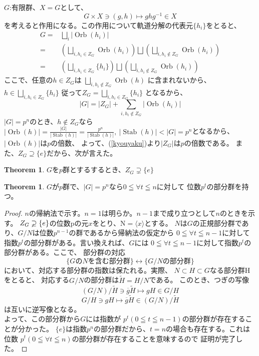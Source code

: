 \documentclass[dvipdfmx]{jsarticle}
\theoremstyle{definition}
\newtheorem{theorem}[definition]{Theorem}
\DeclareMathOperator{\Stab}{Stab}
\DeclareMathOperator{\Orb}{Orb}
\begin{document}
$G$:有限群、$X=G$として、
\[ G\times X\ni (g,h)\longmapsto ghg^{-1}\in X\]
を考えると作用になる。この作用について軌道分解の代表元$\{h_i\}$をとると、
\begin{align*}
             G=&\bigsqcup _{i}\left|\Orb(h_i)\right|\\
              =&\left(\bigsqcup _{i,h_i\in Z_G}\Orb(h_i)\right)\bigsqcup
              \left(\bigsqcup _{i,h_i\notin Z_G}\Orb(h_i)\right)\\
              =&\left(\bigsqcup _{i,h_i\in Z_G}\{h_i\}\right)\bigsqcup 
              \left(\bigsqcup _{i,h_i\notin Z_G}\Orb(h_i)\right)
\end{align*}
ここで、任意の$h\in Z_{G}$は
$\bigsqcup _{i,h_i\notin Z_G}\Orb(h)$
に含まれないから、$h\in\bigsqcup _{i,h_i\in Z_G}\{h_i\}$
従って$Z_{G}=\bigsqcup _{i,h_i\in Z_G}\{h_i\}$
となるから、
\begin{equation}\label{kyouyaku}
    |G|=|Z_{G}|
              +\sum_{i,h_i\notin Z_G}\left|\Orb(h_i)\right|
\end{equation}
$|G|=p^n$のとき、$h\notin Z_G$なら
$\left|\Orb(h)\right|
=\frac{|G|}{|\Stab(h)|}=\frac{p^n}{|\Stab(h)|},\>
\left|\Stab(h)\right|< |G|=p^n$となるから、$|\Orb(h)|$は$p$の倍数、
よって、(\ref{kyouyaku})より$|Z_G|$は$p$の倍数である。
また、$Z_G\supseteq \{e\}$だから、次が言えた。
\begin{theorem}
  $G$を$p$群とするするとき、$Z_G\supsetneq \{e\}$
\end{theorem}
\begin{theorem}\label{pgrp}
  $G$が$p$群で、$|G|=p^n$なら$0\leqq\forall t\leqq n$に対して
  位数$p^t$の部分群を持つ。
\end{theorem}
\begin{proof}
 $n$の帰納法で示す。$n=1$は明らか。$n-1$まで成り立つとして$n$のときを示す。
  $Z_G\varsupsetneq \{e\}$の位数pの元$x$をとり、$\mathrm{N}=\langle x\rangle$とする。
  $N$は$G$の正規部分群であり、$G/N$は位数$p^{n-1}$の群であるから帰納法の仮定から
  $0\leqq\forall t\leqq n-1$に対して指数$p^t$の部分群がある。言い換えれば、$G$には
  $0\leqq\forall t\leqq n-1$に対して指数$p^t$の部分群がある。ここで、
  部分群の対応
  \[\{G\mathrm{の}N\mathrm{を含む部分群}\}
  \longleftrightarrow
   \{G/N\mathrm{の部分群}\}\]
において、対応する部分群の指数は保たれる。実際、
$N\subset H\subset G$なる部分群Hをとると、
対応する$G/N$の部分群は$\tilde{H}=H/N$である。
このとき、つぎの写像
\[\left(G/N\right)/\tilde{H}\ni
\overline{g}\tilde{H}\longmapsto gH\in G/H\]
\[G/H\ni gH\longmapsto\overline{g}\tilde{H}\in\left(G/N\right)/\tilde{H}\]
は互いに逆写像となる。\\
よって、この部分群から$G$には指数が
$p^t(0\leqq t\leqq n-1)$の部分群が存在することが分かった。
$\{e\}$は指数$p^n$の部分群だから、$t=n$の場合も存在する。これは位数
$p^t(0\leqq \forall t\leqq n)$の部分群が存在することを意味するので
証明が完了した。
\end{proof}
\end{document}
